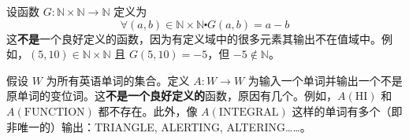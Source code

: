 \begin{example}
    设函数 $G : \mathbb{N} \times \mathbb{N} \to \mathbb{N}$ 定义为
    \[\forall (a, b) \in \mathbb{N} \times \mathbb{N} \centerdot G(a, b) = a - b\]
    这\textbf{不是}一个良好定义的函数，因为有定义域中的很多元素其输出不在值域中。例如，$(5, 10) \in \mathbb{N} \times \mathbb{N}$ 且 $G(5, 10) = -5$，但 $-5 \notin \mathbb{N}$。
\end{example}

\begin{example}
    假设 $W$ 为所有英语单词的集合。定义 $A: W \to W$ 为输入一个单词并输出一个不是原单词的变位词。这\textbf{不是一个良好定义的}函数，原因有几个。例如，$A(\text{HI})$ 和 $A(\text{FUNCTION})$ 都不存在。此外，像 $A(\text{INTEGRAL})$ 这样的单词有多个（即非唯一的）输出：TRIANGLE, ALERTING, ALTERING……。
\end{example}